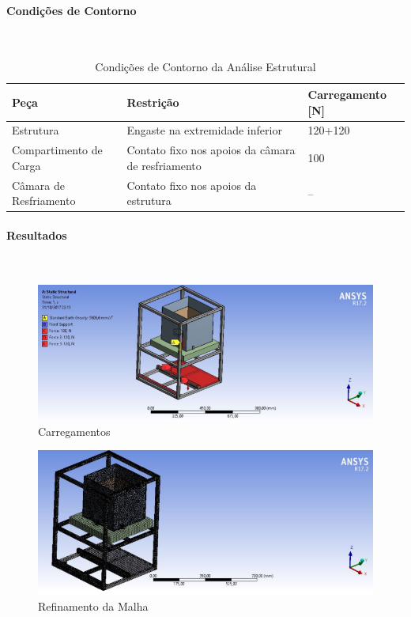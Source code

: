 \paragraph*{Condições de Contorno}\
\begin{table}[H]
\centering
\caption{Condições de Contorno da Análise Estrutural}
\label{condcontornoestrut}
\begin{tabular}{|p{4 cm}|p{4 cm}|p{4 cm}|}
\hline
Peça                   & Restrição                                         & Carregamento {[}N{]} \\ \hline
Estrutura              & Engaste na extremidade inferior                   & 120+120              \\ \hline
Compartimento de Carga & Contato fixo nos apoios da câmara de resfriamento & 100                  \\ \hline
Câmara de Resfriamento & Contato fixo nos apoios da estrutura              & --                   \\ \hline
\end{tabular}
\end{table}

\paragraph*{Resultados}\

\begin{figure}[H]
\centering
\includegraphics[width=16cm]{figuras/carregamentos.png}
\caption{Carregamentos}
\end{figure}

\begin{figure}[H]
\centering
\includegraphics[width=16cm]{figuras/malharefinada.png}
\caption{Refinamento da Malha}
\end{figure}


